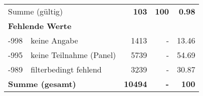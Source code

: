 \begin{longtable}{lXrrr}
     \midrule
     \multicolumn{2}{l}{Summe (gültig)} &
       \textbf{\num{103}} &
     \textbf{100} &
       \textbf{\num[round-mode=places,round-precision=2]{0,98}} \\
     \multicolumn{5}{l}{\textbf{Fehlende Werte}}\\
       -998 &
       keine Angabe &
         \num{1413} &
        - &
         \num[round-mode=places,round-precision=2]{13,46} \\
       -995 &
       keine Teilnahme (Panel) &
         \num{5739} &
        - &
         \num[round-mode=places,round-precision=2]{54,69} \\
       -989 &
       filterbedingt fehlend &
         \num{3239} &
        - &
         \num[round-mode=places,round-precision=2]{30,87} \\
     \midrule
     \multicolumn{2}{l}{\textbf{Summe (gesamt)}} &
          \textbf{\num{10494}} &
        \textbf{-} &
        \textbf{100} \\
     \bottomrule
     \end{longtable}
     
